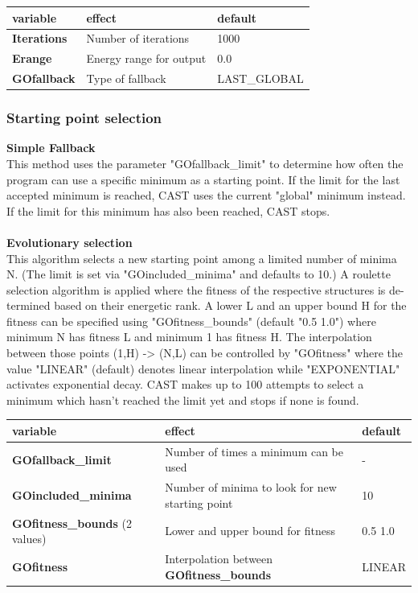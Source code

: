\documentclass[10pt,a4paper]{article} %
\begin{document}
{	\begin{tabularx}{\textwidth}{l|X|X}
		variable & effect & default \\
		\hline
		\textbf{Iterations} & Number of iterations & 1000 \\
		\textbf{Erange} & Energy range for output & 0.0 \\
		\textbf{GOfallback} & Type of fallback & LAST_GLOBAL \\
	\end{tabularx}

	\subsubsection{Starting point selection}
	\textbf{Simple Fallback} \\
	This method uses the parameter "GOfallback_limit" to determine how often the program can use a specific minimum as a starting point. If the limit for the last accepted minimum is reached, CAST uses the current "global" minimum instead. If the limit for this minimum has also been reached, CAST stops.\\~\\

	\textbf{Evolutionary selection} \\
	This algorithm selects a new starting point among a limited number of minima N. (The limit is set via "GOincluded_minima" and defaults to 10.)
	A roulette selection algorithm is applied where the fitness of the respective structures is de-termined based on their energetic rank. A lower L and an upper bound H for the fitness can be specified using "GOfitness_bounds" (default "0.5 1.0") where minimum N has fitness L and minimum 1 has fitness H.
	The interpolation between those points (1,H) -> (N,L) can be controlled by "GOfitness" where the value "LINEAR" (default) denotes linear interpolation while "EXPONENTIAL" activates exponential decay.
	CAST makes up to 100 attempts to select a minimum which hasn’t reached the limit yet and stops if none is found.

	\begin{tabularx}{\textwidth}{l|X|X}
		variable & effect & default \\
		\hline
		\textbf{GOfallback_limit} & Number of times a minimum can be used & - \\
		\textbf{GOincluded_minima} & Number of minima to look for new starting point & 10 \\
		\textbf{GOfitness_bounds} (2 values) & Lower and upper bound for fitness & 0.5 1.0 \\
		\textbf{GOfitness} & Interpolation between \textbf{GOfitness_bounds} & LINEAR \\
	\end{tabularx}
	\\~\\

}
\end{document}

